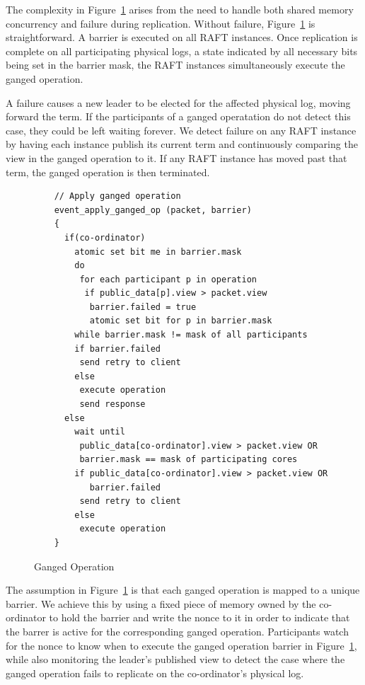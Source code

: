 \documentclass[pageno]{jpaper}
\begin{document}
The complexity in Figure~\ref{fig:ganged_ops} arises from the need to handle
both shared memory concurrency and failure during replication. Without failure,
Figure~\ref{fig:ganged_ops} is straightforward. A barrier is executed on all
RAFT instances. Once replication is complete on all participating physical logs,
a state indicated by all necessary bits being set in the barrier mask, the RAFT
instances simultaneously execute the ganged operation.

A failure causes a new leader to be elected for the affected physical log,
moving forward the term. If the participants of a ganged operatation do not
detect this case, they could be left waiting forever. We detect failure on any
RAFT instance by having each instance publish its current term and continuously
comparing the view in the ganged operation to it. If any RAFT instance has moved
past that term, the ganged operation is then terminated.

\begin{figure}
  \centering
  \scriptsize
\begin{verbatim}
    // Apply ganged operation
    event_apply_ganged_op (packet, barrier)
    {
      if(co-ordinator)
        atomic set bit me in barrier.mask         
        do
         for each participant p in operation
          if public_data[p].view > packet.view
           barrier.failed = true 
           atomic set bit for p in barrier.mask
        while barrier.mask != mask of all participants
        if barrier.failed
         send retry to client
        else       
         execute operation
         send response
      else
        wait until 
         public_data[co-ordinator].view > packet.view OR
         barrier.mask == mask of participating cores
        if public_data[co-ordinator].view > packet.view OR
           barrier.failed
         send retry to client
        else
         execute operation
    }
\end{verbatim}
\caption{Ganged Operation}
\label{fig:ganged_ops}
\end{figure}

The assumption in Figure~\ref{fig:ganged_ops} is that each ganged operation is
mapped to a unique barrier. We achieve this by using a fixed piece of memory
owned by the co-ordinator to hold the barrier and write the nonce to it in order
to indicate that the barrer is active for the corresponding ganged
operation. Participants watch for the nonce to know when to execute the
ganged operation barrier in Figure~\ref{fig:ganged_ops}, while also monitoring
the leader's published view to detect the case where the ganged operation fails
to replicate on the co-ordinator's physical log.
\end{document}
